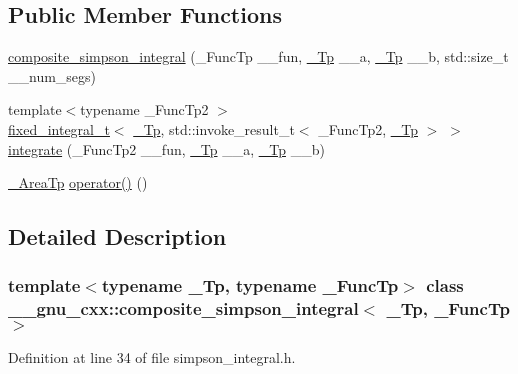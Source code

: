 \subsection*{Public Member Functions}
\begin{DoxyCompactItemize}
\item 
\hyperlink{class____gnu__cxx_1_1composite__simpson__integral_a1348464cb4681d828755d647c513aba7}{composite\+\_\+simpson\+\_\+integral} (\+\_\+\+Func\+Tp \+\_\+\+\_\+fun, \hyperlink{namespace____gnu__cxx_a3b19a9c800ca194374ef9172290f7d79}{\+\_\+\+Tp} \+\_\+\+\_\+a, \hyperlink{namespace____gnu__cxx_a3b19a9c800ca194374ef9172290f7d79}{\+\_\+\+Tp} \+\_\+\+\_\+b, std\+::size\+\_\+t \+\_\+\+\_\+num\+\_\+segs)
\item 
{\footnotesize template$<$typename \+\_\+\+Func\+Tp2 $>$ }\\\hyperlink{struct____gnu__cxx_1_1fixed__integral__t}{fixed\+\_\+integral\+\_\+t}$<$ \hyperlink{namespace____gnu__cxx_a3b19a9c800ca194374ef9172290f7d79}{\+\_\+\+Tp}, std\+::invoke\+\_\+result\+\_\+t$<$ \+\_\+\+Func\+Tp2, \hyperlink{namespace____gnu__cxx_a3b19a9c800ca194374ef9172290f7d79}{\+\_\+\+Tp} $>$ $>$ \hyperlink{class____gnu__cxx_1_1composite__simpson__integral_a932c3e6ea25f340113955340dbec54c0}{integrate} (\+\_\+\+Func\+Tp2 \+\_\+\+\_\+fun, \hyperlink{namespace____gnu__cxx_a3b19a9c800ca194374ef9172290f7d79}{\+\_\+\+Tp} \+\_\+\+\_\+a, \hyperlink{namespace____gnu__cxx_a3b19a9c800ca194374ef9172290f7d79}{\+\_\+\+Tp} \+\_\+\+\_\+b)
\item 
\hyperlink{class____gnu__cxx_1_1composite__simpson__integral_a1a3ef5313bafc1d8523f2d517b066a7a}{\+\_\+\+Area\+Tp} \hyperlink{class____gnu__cxx_1_1composite__simpson__integral_a7c60338016d2c10eddc8bd9b8dfd3264}{operator()} ()
\end{DoxyCompactItemize}


\subsection{Detailed Description}
\subsubsection*{template$<$typename \+\_\+\+Tp, typename \+\_\+\+Func\+Tp$>$\newline
class \+\_\+\+\_\+gnu\+\_\+cxx\+::composite\+\_\+simpson\+\_\+integral$<$ \+\_\+\+Tp, \+\_\+\+Func\+Tp $>$}



Definition at line 34 of file simpson\+\_\+integral.\+h.




